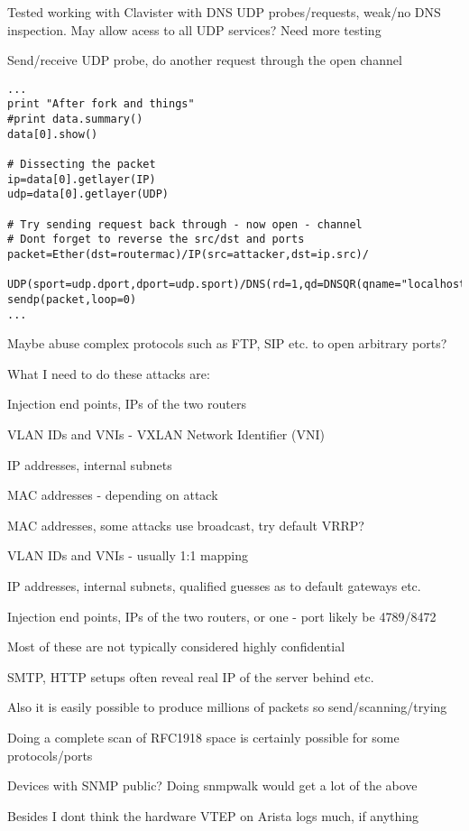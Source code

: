 \documentclass[Screen16to9,17pt]{foils}
\begin{document}
{\small Tested working with Clavister with DNS UDP probes/requests, weak/no DNS inspection. May allow acess to all UDP services? Need more testing}


Send/receive UDP probe, do another request through the open channel
\begin{verbatim}
...
print "After fork and things"
#print data.summary()
data[0].show()

# Dissecting the packet
ip=data[0].getlayer(IP)
udp=data[0].getlayer(UDP)

# Try sending request back through - now open - channel
# Dont forget to reverse the src/dst and ports
packet=Ether(dst=routermac)/IP(src=attacker,dst=ip.src)/
    UDP(sport=udp.dport,dport=udp.sport)/DNS(rd=1,qd=DNSQR(qname="localhost"))
sendp(packet,loop=0)
...
\end{verbatim}

Maybe abuse complex protocols such as FTP, SIP etc. to open arbitrary ports?


What I need to do these attacks are:
\begin{list2}
\item Injection end points, IPs of the two routers
\item VLAN IDs and VNIs - VXLAN Network Identifier (VNI)
\item IP addresses, internal subnets
\item MAC addresses - depending on attack
\end{list2}


\begin{list2}
\item MAC addresses, some attacks use broadcast, try default VRRP?
\item VLAN IDs and VNIs - usually 1:1 mapping
\item IP addresses, internal subnets, qualified guesses as to default gateways etc.
\item Injection end points, IPs of the two routers, or one -
port likely be 4789/8472
\item Most of these are not typically considered highly confidential
\item SMTP, HTTP setups often reveal real IP of the server behind etc.
\item Also it is easily possible to produce millions of packets so send/scanning/trying
\item Doing a complete scan of RFC1918 space is certainly possible for some protocols/ports
\item Devices with SNMP public? Doing snmpwalk would get a lot of the above
\item Besides I dont think the hardware VTEP on Arista logs much, if anything
\end{list2}
\end{document}
